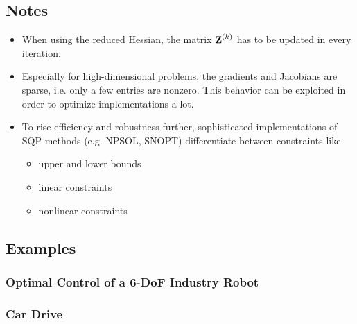 		\subsection{Notes}
			\begin{itemize}
				\item When using the reduced Hessian, the matrix \( \boldsymbol{\mathrm{Z}}^{(k)} \) has to be updated in every iteration.
				\item Especially for high-dimensional problems, the gradients and Jacobians are sparse, i.e. only a few entries are nonzero. This behavior can be exploited in order to optimize implementations a lot.
				\item To rise efficiency and robustness further, sophisticated implementations of SQP methods (e.g. NPSOL, SNOPT) differentiate between constraints like
					\begin{itemize}
						\item upper and lower bounds
						\item linear constraints
						\item nonlinear constraints
					\end{itemize}
			\end{itemize}
		
		\subsection{Examples} %
			
			\subsubsection{Optimal Control of a 6-DoF Industry Robot} %
			
			\subsubsection{Car Drive} %
		
